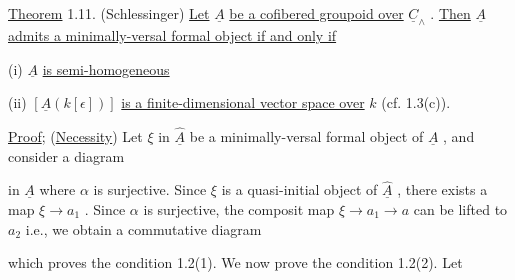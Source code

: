 \underline{Theorem} 1.11. (Schlessinger) \underline{Let} $\underline{A}$ \underline{be a cofibered groupoid over} $\underline{C}_{\wedge}$ . \underline{Then} $\underline{A}$
\underline{admits a minimally-versal formal object if and only if}

  (i)  $\underline{A}$  \underline{is semi-homogeneous}

  (ii)  $[\underline{A}(k[\epsilon])]$  \underline{is a finite-dimensional vector space over}  $k$  (cf. 1.3(c)).

\underline{Proof}; (\underline{Necessity}) Let $\xi$ in $\hat{\underline{A}}$ be a minimally-versal formal object of $\underline{A}$ , and consider a diagram

\begin{center}
\end{center}
in $\underline{A}$ where $\alpha$ is surjective. Since $\xi$ is a quasi-initial object of $\hat{\underline{A}}$ , there exists a map $\xi \to a_1$ . Since $\alpha$ is surjective, the composit map $\xi \to a_1 \to a$ can be lifted to $a_2$ i.e., we obtain a commutative diagram

\begin{center}
\end{center}
which proves the condition 1.2(1). We now prove the condition 1.2(2). Let

